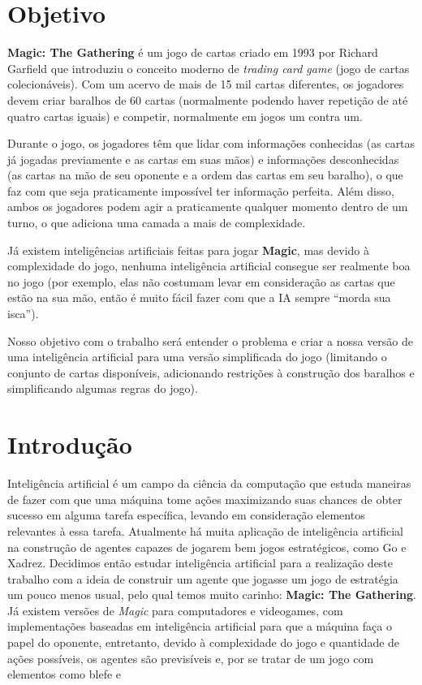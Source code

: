 \documentclass{book}
\begin{document}
\chapter*{Objetivo}
\textbf{Magic: The Gathering} é um jogo de cartas criado em 1993 por
Richard Garfield que introduziu o conceito moderno de \textit{trading
card game} (jogo de cartas colecionáveis). Com um acervo de mais de 15
mil cartas diferentes, os jogadores devem criar baralhos de 60 cartas
(normalmente podendo haver repetição de até quatro cartas iguais) e
competir, normalmente em jogos um contra um.
\par Durante o jogo, os jogadores têm que lidar com informações
conhecidas (as cartas já jogadas previamente e as cartas em suas mãos) e
informações desconhecidas (as cartas na mão de seu oponente e a ordem
das cartas em seu baralho), o que faz com que seja praticamente
impossível ter informação perfeita. Além disso, ambos os jogadores podem
agir a praticamente qualquer momento dentro de um turno, o que adiciona
uma camada a mais de complexidade.
\par Já existem inteligências artificiais feitas para jogar
\textbf{Magic}, mas devido à complexidade do jogo, nenhuma inteligência
artificial consegue ser realmente boa no jogo (por exemplo, elas não
costumam levar em consideração as cartas que estão na sua mão, então é
muito fácil fazer com que a IA sempre ``morda sua isca'').
\par Nosso objetivo com o trabalho será entender o problema e criar a
nossa versão de uma inteligência artificial para uma versão simplificada
do jogo (limitando o conjunto de cartas disponíveis, adicionando
restrições à construção dos baralhos e simplificando algumas regras do
jogo).

\chapter{Introdução}

Inteligência artificial é um campo da ciência da computação que estuda
maneiras de fazer com que uma máquina tome ações maximizando suas chances
de obter sucesso em alguma tarefa específica, levando em consideração
elementos relevantes à essa tarefa. Atualmente há muita aplicação de
inteligência artificial na construção de agentes capazes de jogarem bem
jogos estratégicos, como Go e Xadrez. Decidimos então estudar inteligência
artificial para a realização deste trabalho com a ideia de construir um
agente que jogasse um jogo de estratégia um pouco menos usual, pelo qual
temos muito carinho: \textbf{Magic: The Gathering}. Já existem versões de
\textit{Magic} para computadores e videogames, com implementações baseadas
em inteligência artificial para que a máquina faça o papel do oponente,
entretanto, devido à complexidade do jogo e quantidade de ações possíveis,
os agentes são previsíveis e, por se tratar de um jogo com elementos como
blefe e
\end{document}

